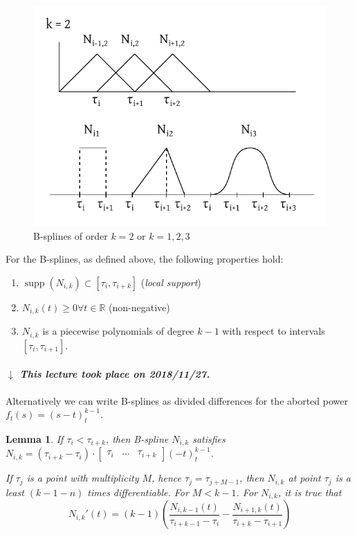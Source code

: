 \documentclass[a4paper]{article}
\newcounter{lecref}[section]
\numberwithin{lecref}{section}
\theoremstyle{break}
\newtheorem{lemma}[lecref]{Lemma}
\newcommand{\dateref}[1]{%
  \begin{mdframed}[backgroundcolor=gray!10,innerbottommargin=0pt,innertopmargin=0pt]
    \paragraph{\textit{$\downarrow$ This lecture took place on #1.}}%
  \end{mdframed}%
}
\begin{document}
\begin{figure}[!ht]
  \begin{center}
    \includegraphics{img/bsplines.pdf}
    \caption{B-splines of order $k = 2$ or $k = 1, 2, 3$}
  \end{center}
\end{figure}

For the B-splines, as defined above, the following properties hold:
\begin{enumerate}
  \item $\operatorname{supp}(N_{i,k}) \subset [\tau_i, \tau_{i+k}]$ (\emph{local support})
  \item $N_{i,k}(t) \geq 0 \forall t \in \mathbb R$ (non-negative)
  \item $N_{i,k}$ is a piecewise polynomials of degree $k-1$ with respect to intervals $[\tau_i, \tau_{i+1}]$.
\end{enumerate}

\dateref{2018/11/27}

Alternatively we can write B-splines as divided differences for the aborted power $f_t(s) = (s - t)_t^{k-1}$.

\begin{lemma}
  \label{lemma:b-spline}
  If $\tau_i < \tau_{i+k}$, then B-spline $N_{i,k}$ satisfies $N_{i,k} = (\tau_{i+k} - \tau_i) \cdot \begin{bmatrix} \tau_i & \dots & \tau_{i+k} \end{bmatrix} (-t)_t^{k-1}$.

  If $\tau_j$ is a point with multiplicity $M$, hence $\tau_j = \tau_{j+M-1}$, then $N_{i,k}$ at point $\tau_j$ is a least $(k-1-n)$ times differentiable. For $M < k-1$. For $N_{i,k}$, it is true that
  \[ N_{i,k}'(t) = (k-1)\left(\frac{N_{i,k-1}(t)}{\tau_{i+k-1} - \tau_i} - \frac{N_{i+1,k}(t)}{\tau_{i+k} - \tau_{i+1}}\right) \]
\end{lemma}
\end{document}
